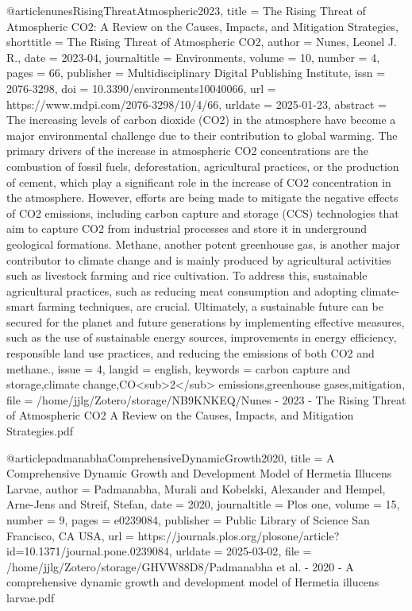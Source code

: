 {{{{@article{nunesRisingThreatAtmospheric2023,
  title = {The {{Rising Threat}} of {{Atmospheric CO2}}: {{A Review}} on the {{Causes}}, {{Impacts}}, and {{Mitigation Strategies}}},
  shorttitle = {The {{Rising Threat}} of {{Atmospheric CO2}}},
  author = {Nunes, Leonel J. R.},
  date = {2023-04},
  journaltitle = {Environments},
  volume = {10},
  number = {4},
  pages = {66},
  publisher = {Multidisciplinary Digital Publishing Institute},
  issn = {2076-3298},
  doi = {10.3390/environments10040066},
  url = {https://www.mdpi.com/2076-3298/10/4/66},
  urldate = {2025-01-23},
  abstract = {The increasing levels of carbon dioxide (CO2) in the atmosphere have become a major environmental challenge due to their contribution to global warming. The primary drivers of the increase in atmospheric CO2 concentrations are the combustion of fossil fuels, deforestation, agricultural practices, or the production of cement, which play a significant role in the increase of CO2 concentration in the atmosphere. However, efforts are being made to mitigate the negative effects of CO2 emissions, including carbon capture and storage (CCS) technologies that aim to capture CO2 from industrial processes and store it in underground geological formations. Methane, another potent greenhouse gas, is another major contributor to climate change and is mainly produced by agricultural activities such as livestock farming and rice cultivation. To address this, sustainable agricultural practices, such as reducing meat consumption and adopting climate-smart farming techniques, are crucial. Ultimately, a sustainable future can be secured for the planet and future generations by implementing effective measures, such as the use of sustainable energy sources, improvements in energy efficiency, responsible land use practices, and reducing the emissions of both CO2 and methane.},
  issue = {4},
  langid = {english},
  keywords = {carbon capture and storage,climate change,CO<sub>2</sub> emissions,greenhouse gases,mitigation},
  file = {/home/jjlg/Zotero/storage/NB9KNKEQ/Nunes - 2023 - The Rising Threat of Atmospheric CO2 A Review on the Causes, Impacts, and Mitigation Strategies.pdf}
}

@article{padmanabhaComprehensiveDynamicGrowth2020,
  title = {A Comprehensive Dynamic Growth and Development Model of {{Hermetia}} Illucens Larvae},
  author = {Padmanabha, Murali and Kobelski, Alexander and Hempel, Arne-Jens and Streif, Stefan},
  date = {2020},
  journaltitle = {Plos one},
  volume = {15},
  number = {9},
  pages = {e0239084},
  publisher = {Public Library of Science San Francisco, CA USA},
  url = {https://journals.plos.org/plosone/article?id=10.1371/journal.pone.0239084},
  urldate = {2025-03-02},
  file = {/home/jjlg/Zotero/storage/GHVW88D8/Padmanabha et al. - 2020 - A comprehensive dynamic growth and development model of Hermetia illucens larvae.pdf}
}

}}}}
